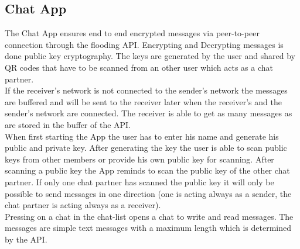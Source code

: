 \subsection{Chat App}
The Chat App ensures end to end encrypted messages via peer-to-peer connection through the flooding API. Encrypting and Decrypting messages is done public key cryptography. The keys are generated by the user and shared by QR codes that have to be scanned from an other user which acts as a chat partner.\\
If the receiver's network is not connected to the sender's network the messages are buffered and will be sent to the receiver later when the receiver's and the sender's network are connected. The receiver is able to get as many messages as are stored in the buffer of the API.\\
When first starting the App the user has to enter his name and generate his public and private key. After generating the key the user is able to scan public keys from other members or provide his own public key for scanning. After scanning a public key the App reminds to scan the public key of the other chat partner. If only one chat partner has scanned the public key it will only be possible to send messages in one direction (one is acting always as a sender, the chat partner is acting always as a receiver).\\
Pressing on a chat in the chat-list opens a chat to write and read messages. The messages are simple text messages with a maximum length which is determined by the API. \\